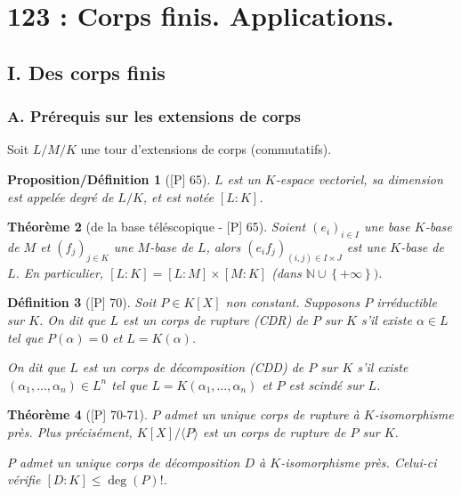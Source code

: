 \documentclass[10pt, a4paper, parskip=full, twoside, twocolumn]{report}
\newtheorem{definition}{Définition}
\newtheorem{theorem}[definition]{Théorème}
\newtheorem{proposition_def}[definition]{Proposition/Définition}
\newcommand{\IN}{\mathbb{N}}
\begin{document}
\chapter*{123 : Corps finis. Applications.}
\setcounter{definition}{0}
\section*{I. Des corps finis}
\subsection*{A. Prérequis sur les extensions de corps}

\textcolor{paragraphtext}{Soit $L/M/K$ une tour d'extensions de corps (commutatifs).}

\begin{proposition_def}[\textnormal{[P] 65}]
	$L$ est un $K$-espace vectoriel, sa dimension est appelée \emph{degré de $L/K$}, et est notée $\left[L:K\right]$.
\end{proposition_def}

\begin{theorem}[de la base téléscopique - \textnormal{[P] 65}]
	Soient $\left(e_i\right)_{i\in I}$ une base $K$-base de $M$ et $\left(f_j\right)_{j\in K}$ une $M$-base de $L$,
	alors $\left(e_if_j\right)_{(i,j)\in I\times J}$ est une $K$-base de $L$.
	En particulier, $[L:K] = [L:M]\times [M:K]$ (dans $\IN\cup \left\{+\infty\right\})$.
\end{theorem}

\begin{definition}[\textnormal{[P] 70}]
	Soit $P\in K[X]$ non constant.
	Supposons $P$ irréductible sur $K$. On dit que $L$ est un \emph{corps de rupture} (CDR) de $P$ sur $K$ s'il existe $\alpha\in L$ tel que $P(\alpha) = 0$ et $L=K(\alpha)$.
	
	On dit que $L$ est un \emph{corps de décomposition} (CDD) de $P$ sur $K$ s'il existe $(\alpha_1,\dots,\alpha_n)\in L^n$ tel que $L = K(\alpha_1,\dots,\alpha_n)$ et $P$ est scindé sur $L$.
\end{definition}

\begin{theorem}[\textnormal{[P] 70-71}]
	$P$ admet un unique corps de rupture à $K$-isomorphisme près.
	Plus précisément, $K[X]/\langle P \rangle$ est un corps de rupture de $P$ sur $K$.

	$P$ admet un unique corps de décomposition $D$ à $K$-isomorphisme près. Celui-ci vérifie $[D:K]\leq \deg(P)!$.
\end{theorem}
\end{document}
